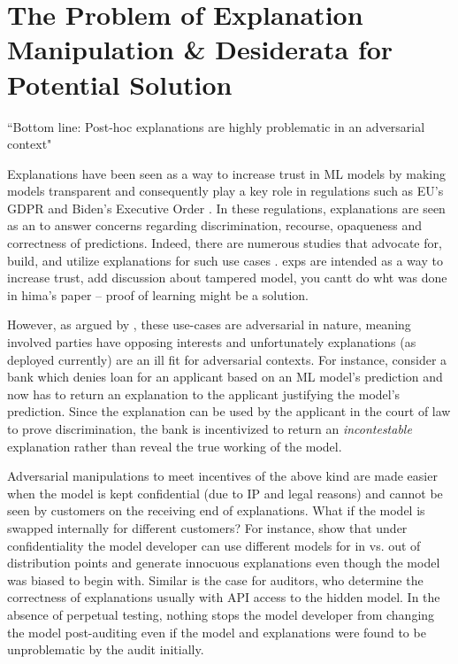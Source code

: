 \section{The Problem of Explanation Manipulation \& Desiderata for Potential Solution}\label{sec:probsol}

\begin{tcolorbox}[colback=gray!10, colframe=gray!50, boxrule=0.5mm, sharp corners]
``Bottom line: Post-hoc explanations
are highly problematic in an
adversarial context" \cite{bordt2022post}
\end{tcolorbox}

Explanations have been seen as a way to increase trust in ML models by making models transparent \cite{} and consequently play a key role in regulations such as EU's GDPR and Biden's Executive Order \cite{}. In these regulations, explanations are seen as an to answer concerns regarding discrimination, recourse, opaqueness and correctness of predictions. Indeed, there are numerous studies that advocate for, build, and utilize explanations for such use cases \cite{yadav2022xaudit,}. exps are intended as a way to increase trust, add discussion about tampered model, you cantt do wht was done in hima's paper -- proof of learning might be a solution.

However, as argued by \cite{bordt2022post}, these use-cases are adversarial in nature, meaning involved parties have opposing interests and unfortunately  explanations (as deployed currently) are an ill fit for adversarial contexts. For instance, consider a bank which denies loan for an applicant based on an ML model's prediction and now has to return an explanation to the applicant justifying the model's prediction. Since the explanation can be used by the applicant in the court of law to prove discrimination, the bank is incentivized to return an \textit{incontestable} explanation rather than reveal the true working of the model.


Adversarial manipulations to meet incentives of the above kind are made easier when the model is kept confidential (due to IP and legal reasons) and cannot be seen by customers on the receiving end of explanations. What if the model is swapped internally for different customers? For instance, \cite{slack2020fooling} show that under confidentiality the model developer can use different models for in vs. out of distribution points and generate innocuous explanations even though the model was biased to begin with. Similar is the case for auditors, who determine the correctness of explanations usually with API access to the hidden model. In the absence of perpetual testing, nothing stops the model developer from changing the model post-auditing even if the model and explanations were found to be unproblematic by the audit initially.

